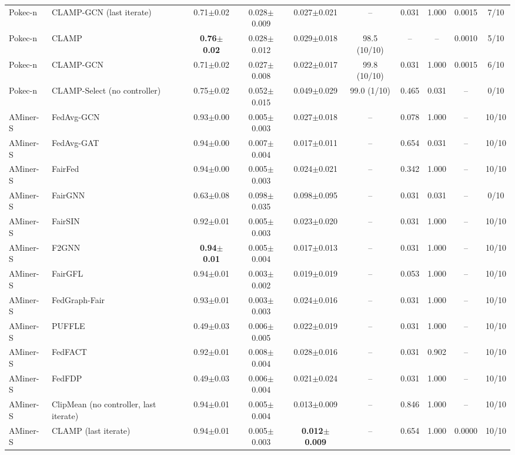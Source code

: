 \begin{table}[tbp]
{\begin{tabular}{llcccccccc}
Pokec-n & CLAMP-GCN (last iterate) & 0.71$\pm$0.02 & 0.028$\pm$0.009 & 0.027$\pm$0.021 & -- & 0.031 & 1.000 & 0.0015 & 7/10 \\
Pokec-n & CLAMP & \textbf{0.76$\pm$0.02} & 0.028$\pm$0.012 & 0.029$\pm$0.018 & 98.5 (10/10) & -- & -- & 0.0010 & 5/10 \\
Pokec-n & CLAMP-GCN & 0.71$\pm$0.02 & 0.027$\pm$0.008 & 0.022$\pm$0.017 & 99.8 (10/10) & 0.031 & 1.000 & 0.0015 & 6/10 \\
Pokec-n & CLAMP-Select (no controller) & 0.75$\pm$0.02 & 0.052$\pm$0.015 & 0.049$\pm$0.029 & 99.0 (1/10) & 0.465 & 0.031 & -- & 0/10 \\
AMiner-S & FedAvg-GCN & 0.93$\pm$0.00 & 0.005$\pm$0.003 & 0.027$\pm$0.018 & -- & 0.078 & 1.000 & -- & 10/10 \\
AMiner-S & FedAvg-GAT & 0.94$\pm$0.00 & 0.007$\pm$0.004 & 0.017$\pm$0.011 & -- & 0.654 & 0.031 & -- & 10/10 \\
AMiner-S & FairFed & 0.94$\pm$0.00 & 0.005$\pm$0.003 & 0.024$\pm$0.021 & -- & 0.342 & 1.000 & -- & 10/10 \\
AMiner-S & FairGNN & 0.63$\pm$0.08 & 0.098$\pm$0.035 & 0.098$\pm$0.095 & -- & 0.031 & 0.031 & -- & 0/10 \\
AMiner-S & FairSIN & 0.92$\pm$0.01 & 0.005$\pm$0.003 & 0.023$\pm$0.020 & -- & 0.031 & 1.000 & -- & 10/10 \\
AMiner-S & F2GNN & \textbf{0.94$\pm$0.01} & 0.005$\pm$0.004 & 0.017$\pm$0.013 & -- & 0.031 & 1.000 & -- & 10/10 \\
AMiner-S & FairGFL & 0.94$\pm$0.01 & 0.003$\pm$0.002 & 0.019$\pm$0.019 & -- & 0.053 & 1.000 & -- & 10/10 \\
AMiner-S & FedGraph-Fair & 0.93$\pm$0.01 & 0.003$\pm$0.003 & 0.024$\pm$0.016 & -- & 0.031 & 1.000 & -- & 10/10 \\
AMiner-S & PUFFLE & 0.49$\pm$0.03 & 0.006$\pm$0.005 & 0.022$\pm$0.019 & -- & 0.031 & 1.000 & -- & 10/10 \\
AMiner-S & FedFACT & 0.92$\pm$0.01 & 0.008$\pm$0.004 & 0.028$\pm$0.016 & -- & 0.031 & 0.902 & -- & 10/10 \\
AMiner-S & FedFDP & 0.49$\pm$0.03 & 0.006$\pm$0.004 & 0.021$\pm$0.024 & -- & 0.031 & 1.000 & -- & 10/10 \\
AMiner-S & ClipMean (no controller, last iterate) & 0.94$\pm$0.01 & 0.005$\pm$0.004 & 0.013$\pm$0.009 & -- & 0.846 & 1.000 & -- & 10/10 \\
AMiner-S & CLAMP (last iterate) & 0.94$\pm$0.01 & 0.005$\pm$0.003 & \textbf{0.012$\pm$0.009} & -- & 0.654 & 1.000 & 0.0000 & 10/10 \\

\end{tabular}}
\end{table}
